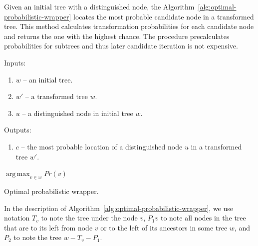 Given an initial tree with a distinguished node, the Algorithm~\ref{alg:optimal-probabilistic-wrapper} locates the most probable candidate node in a transformed tree. This method calculates transformation probabilities for each candidate node and returns the one with the highest chance. The procedure precalculates probabilities for subtrees and thus later candidate iteration is not expensive.

Inputs: 

\begin{enumerate}
	\item $w$ -- an initial tree.
	\item $w'$ -- a transformed tree $w$.
	\item $u$ -- a distinguished node in initial tree $w$.
\end{enumerate}

Outputs: 

\begin{enumerate}
	\item $c$ -- the most probable location of a distinguished node $u$ in a transformed tree $w'$.
\end{enumerate}


\IncMargin{2em}
\begin{algorithm}

	\DontPrintSemicolon

	\BlankLine




	\Return $\operatorname*{arg\,max}_{v \in w} Pr(v)$ \;

	\caption{Optimal probabilistic wrapper.}
	\label{alg:optimal-probabilistic-wrapper}

\end{algorithm}
\DecMargin{2em}

In the description of Algorithm~\ref{alg:optimal-probabilistic-wrapper}, we use notation $T_v$ to note the tree under the node $v$, $P_1v$ to note all nodes in the tree that are to its left from node $v$ or to the left of its ancestors in some tree $w$, and $P_2$ to note the tree $w - T_v - P_1$.

